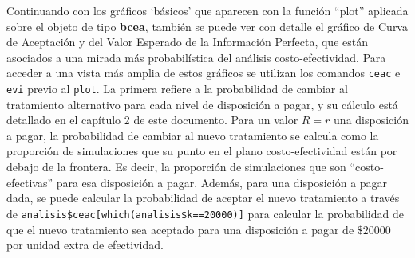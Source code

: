 Continuando con los gráficos `básicos' que aparecen con la función ``plot'' aplicada sobre el objeto de tipo \textbf{bcea}, también se puede ver con detalle el gráfico de Curva de Aceptación y del Valor Esperado de la Información Perfecta, que están asociados a una mirada más probabilística del análisis costo-efectividad. Para acceder a una vista más amplia de estos gráficos se utilizan los comandos \texttt{ceac} e \texttt{evi} previo al \texttt{plot}. La primera refiere a la probabilidad de cambiar al tratamiento alternativo para cada nivel de disposición a pagar, y su cálculo está detallado en el capítulo 2 de este documento. Para un valor $R=r$ una disposición a pagar, la probabilidad de cambiar al nuevo tratamiento se calcula como la proporción de simulaciones que su punto en el plano costo-efectividad están por debajo de la frontera. Es decir, la proporción de simulaciones que son ``costo-efectivas'' para esa disposición a pagar. Además, para una disposición a pagar dada, se puede calcular la probabilidad de aceptar el nuevo tratamiento a través de \texttt{analisis\$ceac[which(analisis\$k==20000)]} para calcular la probabilidad de que el nuevo tratamiento sea aceptado para una disposición a pagar de $\$20000$ por unidad extra de efectividad.

